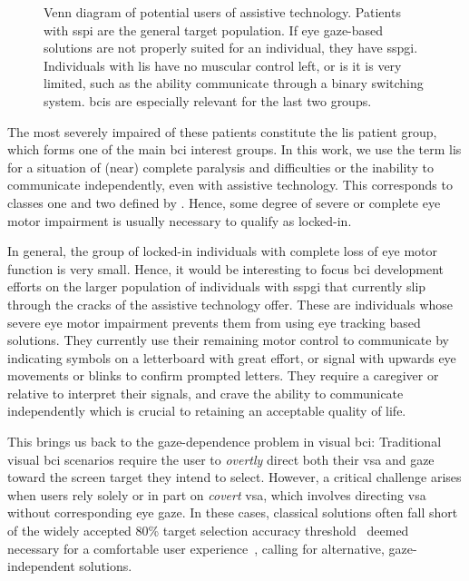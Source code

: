 \begin{figure}
  
  \caption[Venn diagram of potential users of \ac{bci} assistive technology.]{%
    Venn diagram of potential users of assistive technology.
    Patients with \acf{sspi} are the general target population.
    If eye gaze-based solutions are not properly suited for an individual,
    they have \acf{sspgi}.
    Individuals with \ac{lis} have no muscular control left, or is it is very limited,
    such as the ability communicate through a binary switching system.
    \Acp{bci} are especially relevant for the last two groups.
  }
  \label{fig:gaze_independence/venn}
\end{figure}

The most severely impaired of these patients constitute the \ac{lis}
patient group, which forms one of the main \ac{bci} interest groups.
In this work, we use the term \ac{lis} for a situation of (near)
complete paralysis and difficulties or the inability to communicate independently,
even with assistive technology.
This corresponds to classes one and two defined by
\textcite{Wolpaw2006}\fnwolpawcrit.
Hence, some degree of severe or complete eye motor impairment is usually
necessary to qualify as locked-in\fnlis.

In general, the group of locked-in individuals with complete loss of eye motor
function is very small.
Hence, it would be interesting to focus \ac{bci} development efforts on the
larger population of individuals with \ac{sspgi}  that currently slip through
the cracks of the assistive technology offer.
These are individuals whose severe eye motor impairment prevents them from
using eye tracking based solutions.
They currently use their remaining motor control to
communicate by indicating symbols on a letterboard with great effort,
or signal with upwards eye movements or blinks to confirm prompted letters.
They require a caregiver or relative to interpret their signals, and crave
the ability to communicate independently which is crucial to retaining an
acceptable quality of life.

This brings us back to the gaze-dependence problem in visual \ac{bci}:
Traditional visual \ac{bci} scenarios require the user to \emph{overtly} direct both their
\ac{vsa} and gaze toward the screen target they intend to select.
However, a critical challenge arises when users rely solely or in part on
\emph{covert} \ac{vsa}, which involves directing \ac{vsa} without corresponding
eye gaze.
In these cases, classical solutions often fall short of the widely accepted
80\% target selection accuracy threshold~\cite{Brunner2010,Frenzel2011,Treder2010,RonAngevin2019}
deemed necessary for a comfortable user experience~\cite{Neeling2019}, calling for alternative, gaze-independent
solutions.

